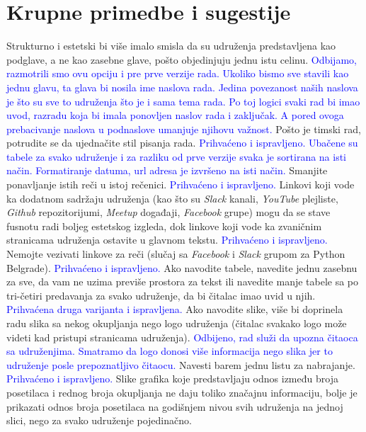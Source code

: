 \documentclass[a4paper]{report}
\newcommand{\odgovor}[1]{\textcolor{blue}{#1}}
\begin{document}
\section{Krupne primedbe i sugestije}
Strukturno i estetski bi više imalo smisla da su udruženja predstavljena kao podglave, 
a ne kao zasebne glave, pošto objedinjuju jednu istu celinu.
\odgovor{Odbijamo, razmotrili smo ovu opciju i pre prve verzije rada. Ukoliko bismo sve stavili kao jednu glavu, ta glava bi nosila ime naslova rada. Jedina povezanost naših naslova je što su sve to udruženja što je i sama tema rada. Po toj logici svaki rad bi imao uvod, razradu koja bi imala ponovljen naslov rada i zaključak. A pored ovoga prebacivanje naslova u podnaslove umanjuje njihovu važnost.}
Pošto je timski rad, potrudite se da ujednačite stil pisanja rada.
\odgovor{Prihvaćeno i ispravljeno. Ubačene su tabele za svako udruženje i za razliku od prve verzije svaka je sortirana na isti način. Formatiranje datuma, url adresa je izvršeno na isti način.}
Smanjite ponavljanje istih reči u istoj rečenici.
\odgovor{Prihvaćeno i ispravljeno.}
Linkovi koji vode ka dodatnom sadržaju udruženja (kao što su \textit{Slack} kanali, \textit{YouTube} plejliste, \textit{Github} repozitorijumi, 
\textit{Meetup} događaji, \textit{Facebook} grupe) mogu da se stave fusnotu radi boljeg estetskog izgleda, dok
linkove koji vode ka zvaničnim stranicama udruženja ostavite u glavnom tekstu. 
\odgovor{Prihvaćeno i ispravljeno.}
Nemojte vezivati linkove za reči (slučaj sa \textit{Facebook} i \textit{Slack} grupom za Python Belgrade). 
\odgovor{Prihvaćeno i ispravljeno.}
Ako navodite tabele, navedite jednu zasebnu za sve, da vam ne uzima previše prostora za tekst ili
navedite manje tabele sa po tri-četiri predavanja za svako udruženje, da bi čitalac imao uvid u njih.
\odgovor{Prihvaćena druga varijanta i ispravljena.}
Ako navodite slike, više bi doprinela radu slika sa nekog okupljanja nego logo 
udruženja (čitalac svakako logo može videti kad pristupi stranicama udruženja).
\odgovor{Odbijeno, rad služi da upozna čitaoca sa udruženjima. Smatramo da logo donosi više informacija nego slika jer to udruženje posle prepoznatljivo čitaocu.}
Navesti barem jednu listu za nabrajanje.
\odgovor{Prihvaćeno i ispravljeno.}
Slike grafika koje predstavljaju odnos između broja posetilaca
i rednog broja okupljanja ne daju toliko značajnu informaciju, bolje je prikazati odnos broja posetilaca na
godišnjem nivou svih udruženja na jednoj slici, nego za svako udruženje pojedinačno.
\end{document}
